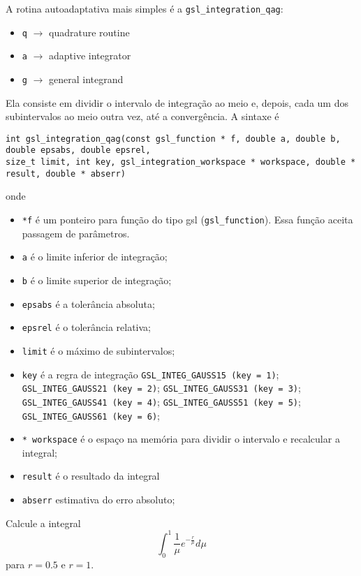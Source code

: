 A rotina autoadaptativa mais simples é a \verb|gsl_integration_qag|:
\begin{itemize}
 \item \verb|q| $\rightarrow$ quadrature routine
 \item \verb|a| $\rightarrow$ adaptive integrator
 \item \verb|g| $\rightarrow$ general integrand
\end{itemize}
Ela consiste em dividir o intervalo de integração ao meio e, depois, cada um dos subintervalos ao meio outra vez, até a convergência. A sintaxe é
\begin{verbatim}
int gsl_integration_qag(const gsl_function * f, double a, double b, double epsabs, double epsrel,
size_t limit, int key, gsl_integration_workspace * workspace, double * result, double * abserr)
\end{verbatim}
onde
\begin{itemize}
\item \verb|*f| é um ponteiro para função do tipo gsl (\verb|gsl_function|). Essa função aceita passagem de parâmetros.
 \item \verb|a| é o limite inferior de integração;
  \item \verb|b| é o limite superior de integração;
 \item \verb|epsabs| é a tolerância absoluta;
 \item \verb|epsrel| é o tolerância relativa;
 \item \verb|limit| é o máximo de subintervalos;
 \item \verb|key| é a regra de integração
 \subitem \verb|GSL_INTEG_GAUSS15 (key = 1)|;
 \subitem \verb|GSL_INTEG_GAUSS21 (key = 2)|;
 \subitem \verb|GSL_INTEG_GAUSS31 (key = 3)|;
 \subitem \verb|GSL_INTEG_GAUSS41 (key = 4)|;
 \subitem \verb|GSL_INTEG_GAUSS51 (key = 5)|;
 \subitem \verb|GSL_INTEG_GAUSS61 (key = 6)|;
 \item \verb|* workspace| é o espaço na memória para dividir o intervalo e recalcular a integral;
 \item \verb|result| é o resultado da integral
 \item \verb|abserr| estimativa do erro absoluto;
\end{itemize}
\begin{ex}\label{ex_gls_int}
Calcule a integral
$$
\int_0^1\frac{1}{\mu}e^{-\frac{r}{\mu} }d\mu
$$
para $r=0.5$ e $r=1$.
\end{ex}
